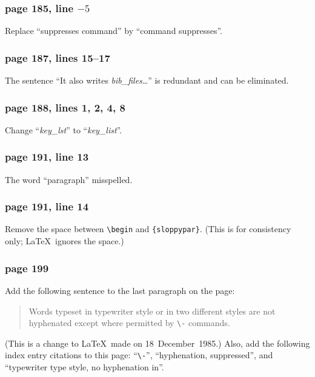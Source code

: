 
\subsubsection*{page 185, line $-5$}
Replace ``suppresses command'' by ``command suppresses''.

\subsubsection*{page 187, lines 15--17}
The sentence ``It also writes {\em bib\_files\/}\ldots'' is
redundant and can be eliminated.

\subsubsection*{page 188, lines 1, 2, 4, 8} 
Change ``{\em key\_lst\/}'' to ``{\em key\_list\/}''.

\subsubsection*{page 191, line 13} 
The word ``paragraph'' misspelled.

\subsubsection*{page 191, line 14}
Remove the space between \verb|\begin| and \verb|{sloppypar}|.
(This is for consistency only; \LaTeX\ ignores the space.)

\subsubsection*{page 199}
Add the following sentence to the last paragraph on the page:
\begin{quote}
Words typeset in typewriter style or in two different styles
are not hyphenated except where permitted by \verb|\-| commands.
\end{quote}
(This is a change to \LaTeX\ made on 18~December~1985.) Also, add the
following index entry citations to this page: ``\verb|\-|'',
``hyphenation, suppressed'', and ``typewriter type style, no
hyphenation in''.

